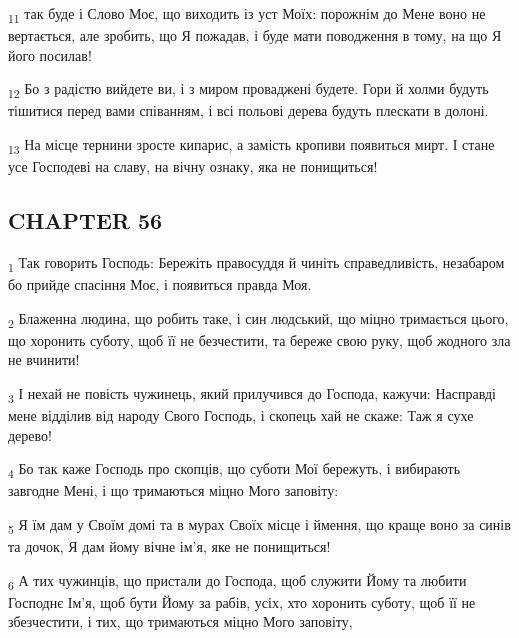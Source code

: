 \begin{tcolorbox}
\textsubscript{11} так буде і Слово Моє, що виходить із уст Моїх: порожнім до Мене воно не вертається, але зробить, що Я пожадав, і буде мати поводження в тому, на що Я його посилав!
\end{tcolorbox}
\begin{tcolorbox}
\textsubscript{12} Бо з радістю вийдете ви, і з миром проваджені будете. Гори й холми будуть тішитися перед вами співанням, і всі польові дерева будуть плескати в долоні.
\end{tcolorbox}
\begin{tcolorbox}
\textsubscript{13} На місце тернини зросте кипарис, а замість кропиви появиться мирт. І стане усе Господеві на славу, на вічну ознаку, яка не понищиться!
\end{tcolorbox}
\subsection{CHAPTER 56}
\begin{tcolorbox}
\textsubscript{1} Так говорить Господь: Бережіть правосуддя й чиніть справедливість, незабаром бо прийде спасіння Моє, і появиться правда Моя.
\end{tcolorbox}
\begin{tcolorbox}
\textsubscript{2} Блаженна людина, що робить таке, і син людський, що міцно тримається цього, що хоронить суботу, щоб її не безчестити, та береже свою руку, щоб жодного зла не вчинити!
\end{tcolorbox}
\begin{tcolorbox}
\textsubscript{3} І нехай не повість чужинець, який прилучився до Господа, кажучи: Насправді мене відділив від народу Свого Господь, і скопець хай не скаже: Таж я сухе дерево!
\end{tcolorbox}
\begin{tcolorbox}
\textsubscript{4} Бо так каже Господь про скопців, що суботи Мої бережуть, і вибирають завгодне Мені, і що тримаються міцно Мого заповіту:
\end{tcolorbox}
\begin{tcolorbox}
\textsubscript{5} Я їм дам у Своїм домі та в мурах Своїх місце і ймення, що краще воно за синів та дочок, Я дам йому вічне ім'я, яке не понищиться!
\end{tcolorbox}
\begin{tcolorbox}
\textsubscript{6} А тих чужинців, що пристали до Господа, щоб служити Йому та любити Господнє Ім'я, щоб бути Йому за рабів, усіх, хто хоронить суботу, щоб її не збезчестити, і тих, що тримаються міцно Мого заповіту,
\end{tcolorbox}
